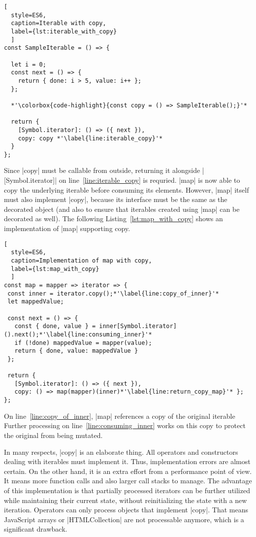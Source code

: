 \begin{lstlisting}[
  style=ES6, 
  caption=Iterable with copy,
  label={lst:iterable_with_copy}
  ]
const SampleIterable = () => {

  let i = 0;
  const next = () => {
    return { done: i > 5, value: i++ };
  };

  *'\colorbox{code-highlight}{const copy = () => SampleIterable();}'*

  return {
    [Symbol.iterator]: () => ({ next }),
    copy: copy *'\label{line:iterable_copy}'*
  }
};
\end{lstlisting}
Since |copy| must be callable from outside, returning it alongside 
|[Symbol.iterator]| on line~\ref{line:iterable_copy} is requried. |map| is now
able to copy the underlying  iterable before consuming its elements.
However, |map| itself must also implement |copy|, because its interface must be
the same as the decorated object (and also to ensure that iterables created
using |map| can be decorated as well). The following Listing~\ref{lst:map_with_copy} 
shows an implementation of |map| supporting copy.

\begin{lstlisting}[
  style=ES6, 
  caption=Implementation of map with copy,
  label={lst:map_with_copy}
  ]
const map = mapper => iterator => {
 const inner = iterator.copy();*'\label{line:copy_of_inner}'*
 let mappedValue;

 const next = () => {
   const { done, value } = inner[Symbol.iterator]().next();*'\label{line:consuming_inner}'*
   if (!done) mappedValue = mapper(value);
   return { done, value: mappedValue }
 };

 return {
   [Symbol.iterator]: () => ({ next }),
   copy: () => map(mapper)(inner)*'\label{line:return_copy_map}'* };
};
\end{lstlisting}
On line~\ref{line:copy_of_inner}, |map| references a copy of the original
iterable Further processing on line~\ref{line:consuming_inner} works on this 
copy to protect the original from being mutated.

In many respects, |copy| is an elaborate thing. All operators and constructors 
dealing with iterables must implement it. Thus, implementation errors are 
almost certain. On the other hand, it is an extra effort from a performance point 
of view. It means more function calls and also larger call stacks to manage.
The advantage of this implementation is that partially processed iterators can
be further utilized while maintaining their current state, without
reinitializing the state with a new iteration.
Operators can only process objects that implement |copy|. That means JavaScript
arrays or |HTMLCollection| are not processable anymore, which is a
significant drawback.

